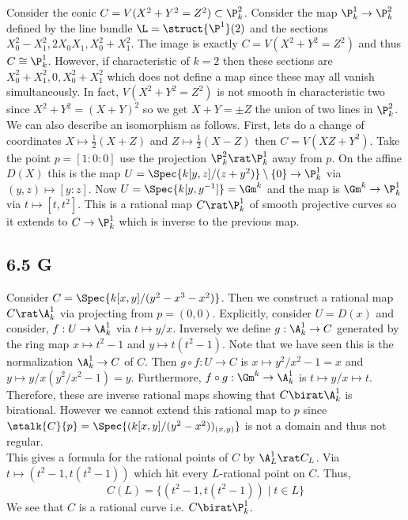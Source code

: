 \documentclass[12pt]{article}
\begin{document}
Consider the conic $C = V(X^2 + Y^2 = Z^2) \subset \P^2_k$. Consider the map $\P^1_k \to \P^2_k$ defined by the line bundle $\L = \struct{\P^1}(2)$ and the sections $X_0^2 - X_1^2, 2 X_0 X_1, X_0^2 + X_1^2$. The image is exactly $C = V(X^2 + Y^2 = Z^2)$ and thus $C \cong \P^1_k$. However, if characteristic of $k = 2$ then these sections are $X_0^2 + X_1^2, 0, X_0^2 + X_1^2$ which does not define a map since these may all vanish simultaneously. In fact, $V(X^2 + Y^2 = Z^2)$ is not smooth in characteristic two since $X^2 + Y^2 = (X + Y)^2$ so we get $X + Y = \pm Z$ the union of two lines in $\P_k^2$. 
\bigskip\\ 
We can also describe an isomorphism as follows. First, lets do a change of coordinates $X \mapsto \tfrac{1}{2}(X + Z)$ and $Z \mapsto \tfrac{1}{2}(X - Z)$ then $C = V(XZ + Y^2)$. 
Take the point $p = [1 : 0 : 0]$ use the projection $\P^2_k \rat \P^1_k$ away from $p$. On the affine $D(X)$ this is the map $U = \Spec{k[y, z]/(z + y^2)} \setminus \{ 0 \} \to \P^1_k$ via $(y, z) \mapsto [y : z]$. Now $U = \Spec{k[y, y^{-1}]} = \Gm^k$ and the map is $\Gm^k \to \P^1_k$ via $t \mapsto [t, t^2]$. This is a rational map $C \rat \P^1_k$ of smooth projective curves so it extends to $C \to \P^1_k$ which is inverse to the previous map. 

\subsection{6.5 G}

Consider $C = \Spec{k[x, y]/(y^2 - x^3 - x^2)}$. Then we construct a rational map $C \rat \A^1_k$ via projecting from $p = (0,0)$. Explicitly, consider $U = D(x)$ and consider, $f : U \to \A^1_k$ via $t \mapsto y/x$. Inversely we define $g : \A^1_k \to C$ generated by the ring map $x \mapsto t^2 - 1$ and $y \mapsto  t(t^2 - 1)$. Note that we have seen this is the normalization $\A^1_k \to C$ of $C$. Then $g \circ f : U \to C$ is $x \mapsto y^2/x^2 - 1 = x$ and $y \mapsto y/x(y^2/x^2 - 1) = y$. Furthermore, $f \circ g : \Gm^k \to \A^1_k$ is $t \mapsto y/x \mapsto t$. Therefore, these are inverse rational maps showing that $C \birat \A^1_k$ is birational. However we cannot extend this rational map to $p$ since $\stalk{C}{p} = \Spec{(k[x, y]/(y^2 - x^2))_{(x, y)}}$ is not a domain and thus not regular.
\bigskip\\
This gives a formula for the rational points of $C$ by $\A^1_L \rat C_L$. Via $t \mapsto (t^2 - 1, t(t^2 - 1))$ which hit every $L$-rational point on $C$. Thus,
\[ C(L) = \{ (t^2 - 1, t(t^2 - 1)) \mid t \in L \} \]
We see that $C$ is a rational curve i.e. $C \birat \P^1_k$. 
\end{document}

